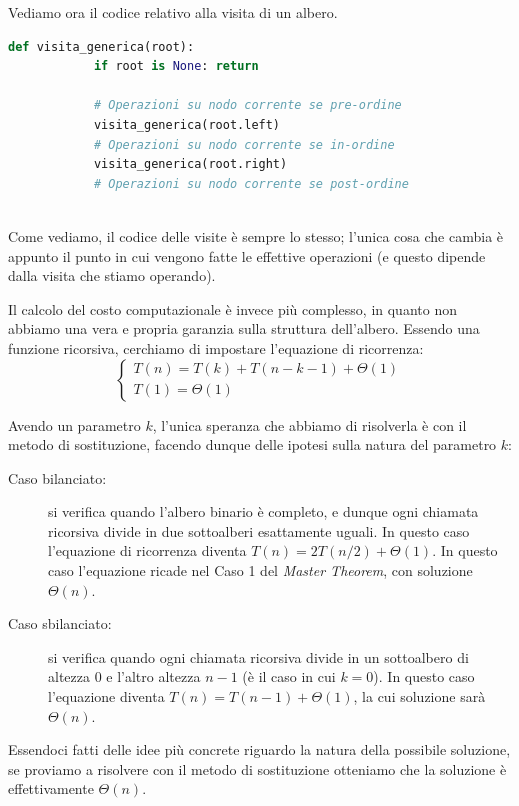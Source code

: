 \documentclass[12pt]{report}
\begin{document}
	\newpage
	Vediamo ora il codice relativo alla visita di un albero.
	
	\begin{lstlisting}[language=Python, caption={Algoritmo generico di visita di un albero}]
		def visita_generica(root):
			if root is None: return
			
			# Operazioni su nodo corrente se pre-ordine
			visita_generica(root.left)
			# Operazioni su nodo corrente se in-ordine
			visita_generica(root.right)
			# Operazioni su nodo corrente se post-ordine
			
	\end{lstlisting}
	
	Come vediamo, il codice delle visite è sempre lo stesso; l'unica cosa che cambia è appunto il punto in cui vengono fatte le effettive operazioni (e questo dipende dalla visita che stiamo operando).
	
	Il calcolo del costo computazionale è invece più complesso, in quanto non abbiamo una vera e propria garanzia sulla struttura dell'albero. Essendo una funzione ricorsiva, cerchiamo di impostare l'equazione di ricorrenza:
	\[
	\begin{cases}
		T(n) = T(k) + T(n - k - 1) + \Theta(1) \\
		T(1) = \Theta(1)
	\end{cases}
	\]
	
	Avendo un parametro $k$, l'unica speranza che abbiamo di risolverla è con il metodo di sostituzione, facendo dunque delle ipotesi sulla natura del parametro $k$:
	\begin{description}
		\item[Caso bilanciato:] si verifica quando l'albero binario è completo, e dunque ogni chiamata ricorsiva divide in due sottoalberi esattamente uguali. In questo caso l'equazione di ricorrenza diventa $T(n) = 2T(n/2) + \Theta(1)$. In questo caso l'equazione ricade nel Caso 1 del \textit{Master Theorem}, con soluzione $\Theta(n)$.
		\item[Caso sbilanciato:] si verifica quando ogni chiamata ricorsiva divide in un sottoalbero di altezza $0$ e l'altro altezza $n-1$ (è il caso in cui $k = 0$). In questo caso l'equazione diventa $T(n) = T(n-1) + \Theta(1)$, la cui soluzione sarà $\Theta(n)$.
	\end{description}
	
	Essendoci fatti delle idee più concrete riguardo la natura della possibile soluzione, se proviamo a risolvere con il metodo di sostituzione otteniamo che la soluzione è effettivamente $\Theta(n)$.
	
\end{document}
